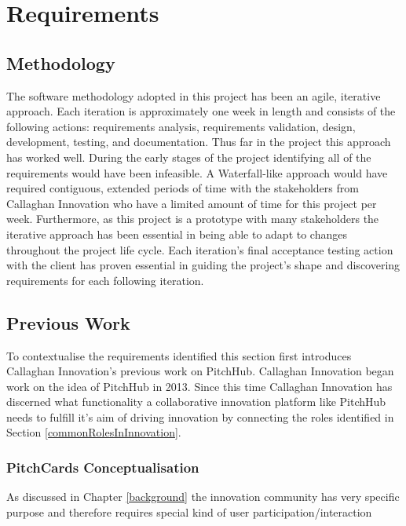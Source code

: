 \chapter{Requirements}

\section{Methodology}

The software methodology adopted in this project has been an agile, iterative approach. Each iteration is approximately one week in length and consists of the following actions: requirements analysis, requirements validation, design, development, testing, and documentation. Thus far in the project this approach has worked well. During the early stages of the project identifying all of the requirements would have been infeasible. A Waterfall-like approach would have required contiguous, extended periods of time with the stakeholders from Callaghan Innovation who have a limited amount of time for this project per week. Furthermore, as this project is a prototype with many stakeholders the iterative approach has been essential in being able to adapt to changes throughout the project life cycle. Each iteration's final acceptance testing action with the client has proven essential in guiding the project's shape and discovering requirements for each following iteration.

\section{Previous Work}

To contextualise the requirements identified this section first introduces Callaghan Innovation's previous work on PitchHub. Callaghan Innovation began work on the idea of PitchHub in 2013. Since this time Callaghan Innovation has discerned what functionality a collaborative innovation platform like PitchHub needs to fulfill it's aim of driving innovation by connecting the roles identified in Section \ref{commonRolesInInnovation}.

\subsection{PitchCards Conceptualisation}
As discussed in Chapter \ref{background} the innovation community has very specific purpose and therefore requires special kind of user participation/interaction 